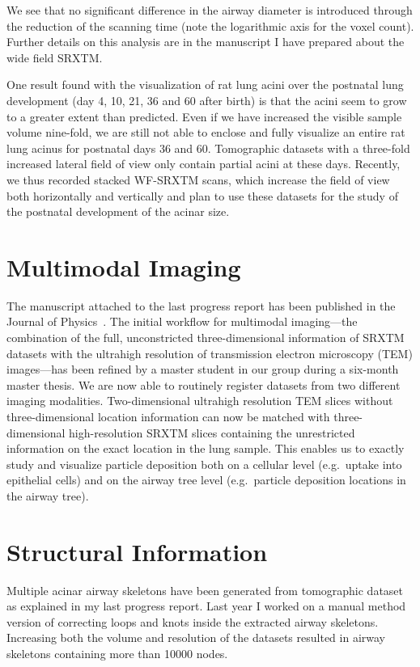 \documentclass[a4paper,twoside,DIV=calc]{scrartcl}
\begin{document}
We see that no significant difference in the airway diameter is introduced through the reduction of the scanning time (note the logarithmic axis for the voxel count). Further details on this analysis are in the manuscript I have prepared about the wide field SRXTM.

One result found with the visualization of rat lung acini over the postnatal lung development (day 4, 10, 21, 36 and 60 after birth) is that the acini seem to grow to a greater extent than predicted. Even if we have increased the visible sample volume nine-fold, we are still not able to enclose and fully visualize an entire rat lung acinus for postnatal days 36 and 60. Tomographic datasets with a three-fold increased lateral field of view only contain partial acini at these days. Recently, we thus recorded stacked WF-SRXTM scans, which increase the field of view both horizontally and vertically and plan to use these datasets for the study of the postnatal development of the acinar size.

\section{Multimodal Imaging}
The manuscript attached to the last progress report has been published in the Journal of Physics~\cite{Haberthuer2009}. The initial workflow for multimodal imaging---the combination of the full, unconstricted three-dimensional information of SRXTM datasets with the ultrahigh resolution of transmission electron microscopy (TEM) images---has been refined by a master student in our group during a six-month master thesis. We are now able to routinely register datasets from two different imaging modalities. Two-dimensional ultrahigh resolution TEM slices without three-dimensional location information can now be matched with three-dimensional high-resolution SRXTM slices containing the unrestricted information on the exact location in the lung sample. This enables us to exactly study and visualize particle deposition both on a cellular level (e.g.\, uptake into epithelial cells) and on the airway tree level (e.g.\, particle deposition locations in the airway tree).

\section{Structural Information}
Multiple acinar airway skeletons have been generated from tomographic dataset as explained in my last progress report. Last year I worked on a manual method version of correcting loops and knots inside the extracted airway skeletons. Increasing both the volume and resolution of the datasets resulted in airway skeletons containing more than \num{10000} nodes. 
\end{document}
